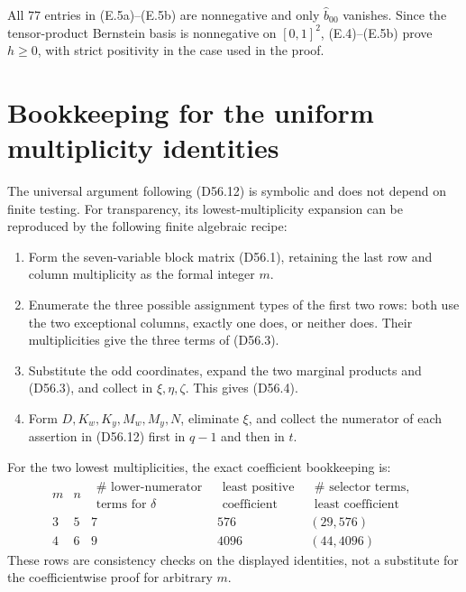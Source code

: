 \documentclass[11pt]{amsart}
\theoremstyle{definition}
\theoremstyle{remark}
\newenvironment{exacttable}
  {\begingroup\small
   \setlength{\arraycolsep}{4pt}%
   \renewcommand{\arraystretch}{1.12}}
  {\endgroup}
\begin{document}
All \(77\) entries in (E.5a)--(E.5b) are nonnegative and only
\(\widehat b_{00}\) vanishes.  Since the tensor-product Bernstein basis is
nonnegative on \([0,1]^2\), (E.4)--(E.5b) prove \(h\geq0\), with strict
positivity in the case used in the proof.

\section{Bookkeeping for the uniform multiplicity identities}
\label{app:uniform-bookkeeping}

The universal argument following (D56.12) is symbolic and does not depend
on finite testing.  For transparency, its lowest-multiplicity expansion can
be reproduced by the following finite algebraic recipe:

\begin{enumerate}
\item Form the seven-variable block matrix (D56.1), retaining the last
  row and column multiplicity as the formal integer \(m\).
\item Enumerate the three possible assignment types of the first two rows:
  both use the two exceptional columns, exactly one does, or neither does.
  Their multiplicities give the three terms of (D56.3).
\item Substitute the odd coordinates, expand the two marginal products and
  (D56.3), and collect in \(\xi,\eta,\zeta\).  This gives (D56.4).
\item Form \(D,K_w,K_y,M_w,M_y,N\), eliminate \(\xi\), and collect the
  numerator of each assertion in (D56.12) first in \(q-1\) and then in
  \(t\).
\end{enumerate}

For the two lowest multiplicities, the exact coefficient bookkeeping is:
\begin{exacttable}
\[
\begin{array}{c|c|c|c|c}
m&n&
\begin{gathered}\#\text{ lower-numerator}\\[-2pt]\text{terms for }\delta\end{gathered}
&\begin{gathered}\text{least positive}\\[-2pt]\text{coefficient}\end{gathered}
&\begin{gathered}\#\text{ selector terms},\\[-2pt]\text{least coefficient}\end{gathered}\\ \hline
3&5&7&576&(29,576)\\
4&6&9&4096&(44,4096)
\end{array}
\tag{F.1}
\]
\end{exacttable}
These rows are consistency checks on the displayed identities, not a
substitute for the coefficientwise proof for arbitrary \(m\).
\end{document}
